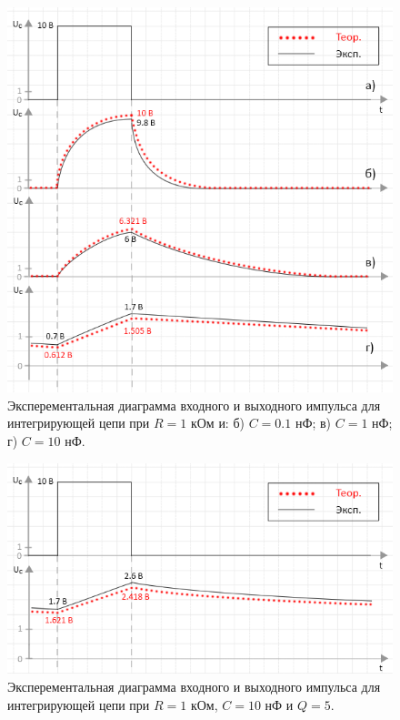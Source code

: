 \begin{figure}[H]
	\begin{center}
		\includegraphics[width=14cm]{img/int_with_theory}
		\caption{Эксперементальная диаграмма входного и выходного импульса для интегрирующей цепи при $R = 1$ кОм и: б) $C = 0.1$ нФ; в) $C = 1$ нФ; г) $C = 10$ нФ.} 
		\label{i:1} %
	\end{center}
\end{figure}

\begin{figure}[H]
	\begin{center}
		\includegraphics[width=14cm]{img/q5_with_theory}
		\caption{Эксперементальная диаграмма входного и выходного импульса для интегрирующей цепи при $R = 1$ кОм, $C = 10$ нФ и $Q = 5$.} 
		\label{i:2} %
	\end{center}
\end{figure}

